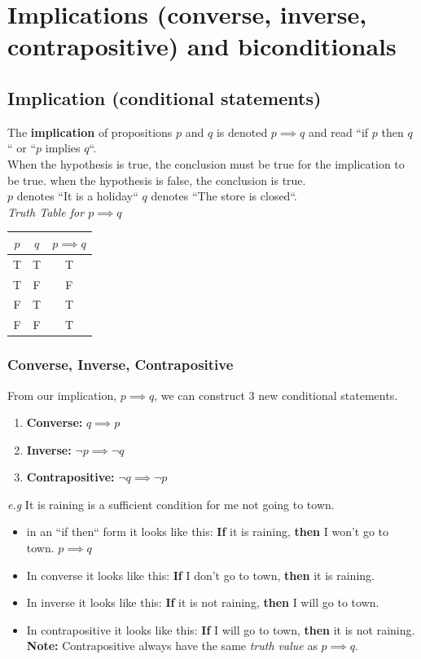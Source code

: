 \documentclass{article}
\begin{document}
\clearpage
\section{Implications (converse, inverse, contrapositive) and biconditionals}
\subsection{Implication (conditional statements)}
The \textbf{implication} of propositions $ p $ and $ q $ is denoted $ p \implies q $ and read ``if $ p $ then $ q $`` or ``$ p $ implies $ q $``.\\


When the hypothesis is true, the conclusion must be true for the implication to be true. when the hypothesis is false, the conclusion is true.\\


$ p $ denotes ``It is a holiday`` $ q $ denotes ``The store is closed``. \\


\textit{Truth Table for $ p \implies q $}
\begin{tabular}{|c|c|c|}
\hline
$ p $ & $ q $ & $ p \implies q $ \\
\hline
T & T & T \\ 
T & F & F \\
F & T & T \\
F & F & T \\
\hline 
\end{tabular}
\subsubsection{Converse, Inverse, Contrapositive}
From our implication, $ p \implies q $, we can construct 3 new conditional statements.
\begin{enumerate}
	\item \textbf{Converse: }$ q \implies p $ 
	\item \textbf{Inverse: }$ \neg p \implies \neg q $
	\item \textbf{Contrapositive: }$ \neg q \implies \neg p $
\end{enumerate}


\textit{e.g} It is raining is a sufficient condition for me not going to town.
\begin{itemize}
	\item in an ``if then`` form it looks like this: \textbf{If} it is raining, \textbf{then} I won't go to town. $ p \implies q $
	\item In converse it looks like this: \textbf{If} I don't go to town, \textbf{then} it is raining.
	\item In inverse it looks like this: \textbf{If} it is not raining, \textbf{then} I will go to town.
	\item In contrapositive it looks like this: \textbf{If} I will go to town, \textbf{then} it is not raining.\\
\textbf{Note: }Contrapositive always have the same \textit{truth value} as $ p \implies q $.
\end{itemize}
\end{document}
